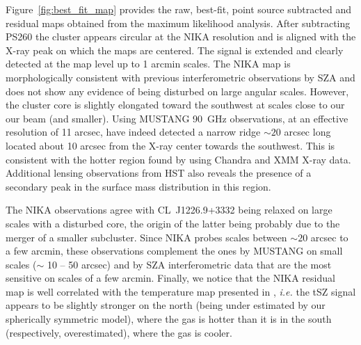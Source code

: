 \documentclass[twocolumn,traditabstract]{aa}
\begin{document}
Figure~\ref{fig:best_fit_map} provides the raw, best-fit, point source subtracted and residual maps obtained from the maximum likelihood analysis. After subtracting PS260 the cluster appears circular at the NIKA resolution and is aligned with the \mbox{X-ray} peak on which the maps are centered. The signal is extended and clearly detected at the map level up to 1 arcmin scales. The NIKA map is morphologically consistent with previous interferometric observations by SZA \citep{joy2001,muchovej2007,mroczkowski2009} and does not show any evidence of being disturbed on large angular scales. However, the cluster core is slightly elongated toward the southwest at scales close to our our beam (and smaller). Using MUSTANG 90~GHz observations, at an effective resolution of 11 arcsec, \cite{korngut2011} have indeed detected a narrow ridge $\sim 20$ arcsec long located about 10 arcsec from the \mbox{X-ray} center towards the southwest. This is consistent with the hotter region found by \cite{maughan2007} using Chandra and XMM \mbox{X-ray} data. Additional lensing observations from HST \citep{jee2009} also reveals the presence of a secondary peak in the surface mass distribution in this region. 

The NIKA observations agree with \mbox{CL~J1226.9+3332} being relaxed on large scales with a disturbed core, the origin of the latter being probably due to the merger of a smaller subcluster. Since NIKA probes scales between $\sim 20$ arcsec to a few arcmin, these observations complement the ones by MUSTANG on small scales ($\sim$ 10 -- 50 arcsec) and by SZA interferometric data that are the most sensitive on scales of a few arcmin. Finally, we notice that the NIKA residual map is well correlated with the temperature map presented in \cite{maughan2007}, {\it i.e.} the tSZ signal appears to be slightly stronger on the north (being under estimated by our spherically symmetric model), where the gas is hotter than it is in the south (respectively, overestimated), where the gas is cooler.
\end{document}
